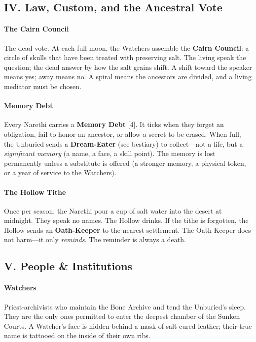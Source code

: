 \documentclass[11pt]{article}
\begin{document}
\subsection*{IV. Law, Custom, and the Ancestral Vote}
\paragraph{The Cairn Council}
The dead vote. At each full moon, the Watchers assemble the \textbf{Cairn Council}: a circle of skulls that have been treated with preserving salt. The living speak the question; the dead answer by how the salt grains shift. A shift toward the speaker means yes; away means no. A spiral means the ancestors are divided, and a living mediator must be chosen.

\paragraph{Memory Debt}
Every Narethi carries a \textbf{Memory Debt} [4]. It ticks when they forget an obligation, fail to honor an ancestor, or allow a secret to be erased. When full, the Unburied sends a \textbf{Dream-Eater} (see bestiary) to collect---not a life, but a \textit{significant memory} (a name, a face, a skill point). The memory is lost permanently unless a substitute is offered (a stronger memory, a physical token, or a year of service to the Watchers).

\paragraph{The Hollow Tithe}
Once per season, the Narethi pour a cup of salt water into the desert at midnight. They speak no names. The Hollow drinks. If the tithe is forgotten, the Hollow sends an \textbf{Oath-Keeper} to the nearest settlement. The Oath-Keeper does not harm---it only \textit{reminds}. The reminder is always a death.

\subsection*{V. People \& Institutions}
\paragraph{Watchers} Priest-archivists who maintain the Bone Archive and tend the Unburied's sleep. They are the only ones permitted to enter the deepest chamber of the Sunken Courts. A Watcher's face is hidden behind a mask of salt-cured leather; their true name is tattooed on the inside of their own ribs.
\end{document}
